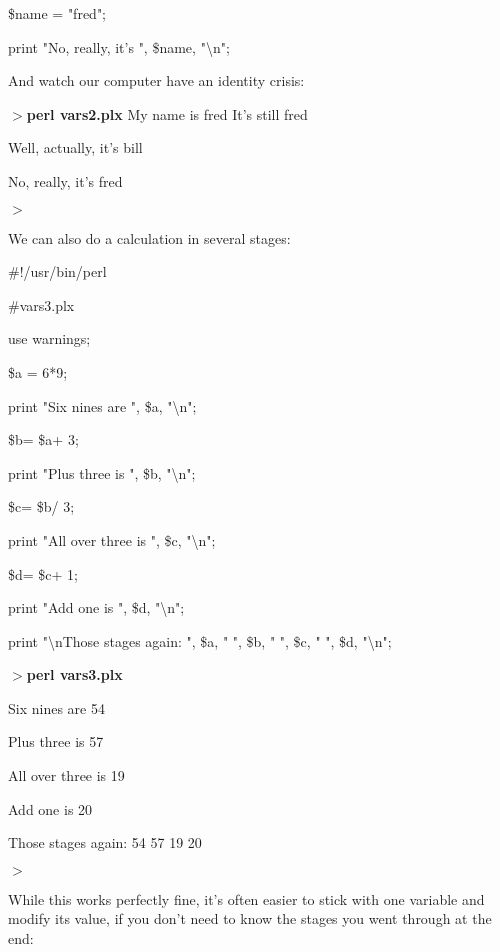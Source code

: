 \documentclass[a4paper,11pt]{book}
\begin{document}
\noindent \$name = "fred";

\noindent print "No, really, it's ", \$name, "\textbackslash n";

\noindent 

\noindent And watch our computer have an identity crisis:

\noindent 

\noindent $>$\textbf{perl vars2.plx }My name is fred It's still fred

\noindent Well, actually, it's bill

\noindent No, really, it's fred

\noindent $>$

\noindent 

\noindent We can also do a calculation in several stages:

\noindent 

\noindent \#!/usr/bin/perl

\noindent \#vars3.plx

\noindent use warnings;

\noindent \$a = 6*9;

\noindent print "Six nines are ", \$a, "\textbackslash n";

\noindent \$b= \$a+ 3;

\noindent print "Plus three is ", \$b, "\textbackslash n";

\noindent \$c= \$b/ 3;

\noindent print "All over three is ", \$c, "\textbackslash n";

\noindent \$d= \$c+ 1;

\noindent print "Add one is ", \$d, "\textbackslash n";

\noindent print "\textbackslash nThose stages again: ", \$a, " ", \$b, " ", \$c, " ", \$d, "\textbackslash n";

\noindent 

\noindent $>$\textbf{perl vars3.plx}

\noindent Six nines are 54

\noindent Plus three is 57

\noindent All over three is 19

\noindent Add one is 20

\noindent 

\noindent 

\noindent Those stages again: 54 57 19 20

\noindent $>$

\noindent 

\noindent While this works perfectly fine, it's often easier to stick with one variable and modify its value, if you don't need to know the stages you went through at the end:
\end{document}
